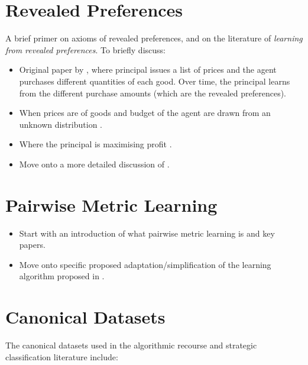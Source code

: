 \section{Revealed Preferences} \label{section:revealed_pref_lit}
A brief primer on axioms of revealed preferences, and on the literature of \textit{learning from revealed preferences}. To briefly discuss:

\begin{itemize}
	\item Original paper by \textcite{beigmanLearningRevealedPreference2006}, where principal issues a list of prices and the agent purchases different quantities of each good. Over time, the principal learns from the different purchase amounts (which are the revealed preferences).
	\item When prices are of goods and budget of the agent are drawn from an unknown distribution \citep{zadimoghaddamEfficientlyLearningRevealed2012, balcanLearningEconomicParameters2014}.
	\item Where the principal is maximising profit \citep{aminOnlineLearningProfit2015, rothWatchLearnOptimizing2016}.
	\item Move onto a more detailed discussion of \textcite{dongStrategicClassificationRevealed2018}.
\end{itemize}


\section{Pairwise Metric Learning}
\begin{itemize}
	\item Start with an introduction of what pairwise metric learning is and key papers.
	\item Move onto specific proposed adaptation/simplification of the learning algorithm proposed in \textcite{canalOneAllSimultaneous2022}.
\end{itemize}


\section{Canonical Datasets}
The canonical datasets used in the algorithmic recourse and strategic classification literature include:

